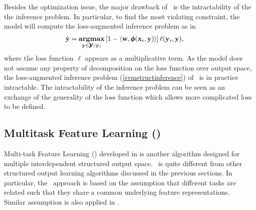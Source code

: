 {Besides the optimization issue, the major drawback of \svmstruct\ is the intractability of the the inference problem.
In particular, to find the most violating constraint, the model will compute the loss-augmented inference problem as in \citep{TJTA05}
\begin{align}
	\hat{\mathbf {y}} = \underset{\mathbf {y}\in\pmb {\mathcal{Y}}/\mathbf {y}_i}{\textbf{argmax}} &\, [1-\langle \mathbf {w}, \pmb \phi(\mathbf {x}_i,\mathbf {y}) \rangle]\,\mathbf {\ell}(\mathbf {y}_i,\mathbf {y}) \label{svmstructinference},
\end{align}
where the loss function $\ell$ appears as a multiplicative term.
As the model does not assume any property of decomposition on the loss function over output space, the loss-augmented inference problem (\ref{svmstructinference}) of \svmstruct\ is in practice intractable. 
The intractability of the inference problem can be seen as an exchange of the generality of the loss function which allows more complicated loss to be defined. 


%
\subsection{Multitask Feature Learning (\mtl)}

Multi-task Feature Learning (\mtl) developed in \citep{Argyriou07multitask} is another algorithm designed for multiple interdependent structured output space.
\mtl\ is quite different from other structured output learning algorithms discussed in the previous sections.
In particular, the \mtl\ approach is based on the assumption that different tasks are related such that they share a common underlying feature representations.
Similar assumption is also applied in \citep{Caruana97multitask,Baxter00a,BenDavide03exploiting}.

}

